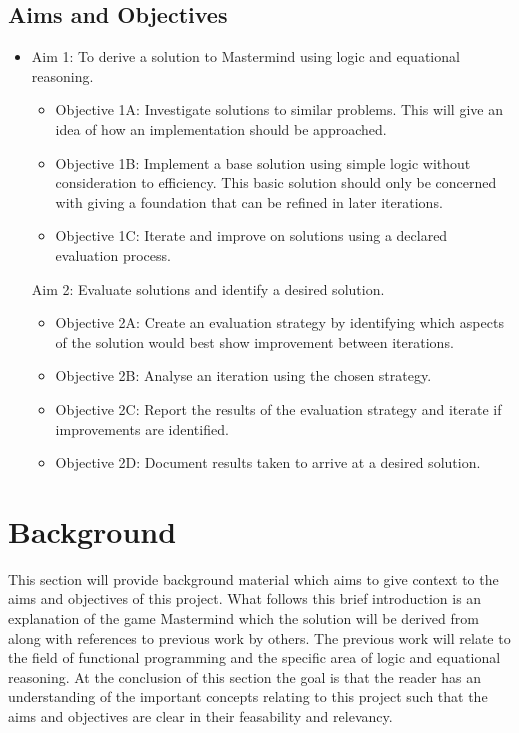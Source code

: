 \documentclass[12pt]{article}  %
\theoremstyle{definition}
\theoremstyle{remark}
\begin{document}
\subsection {Aims and Objectives}
\begin {itemize}

\item{Aim 1: To derive a solution to Mastermind using logic and equational reasoning.}
	\begin {itemize}
	\item{Objective 1A: Investigate solutions to similar problems. This will give an idea of how an implementation should be approached.}
	\item{Objective 1B:  Implement a base solution using simple logic without consideration to efficiency. This basic solution should only be concerned with giving a foundation that can be 		refined in later iterations.}
	\item{Objective 1C: Iterate and improve on solutions using a declared evaluation process.}
	\end {itemize}
Aim 2: Evaluate solutions and identify a desired solution.
	\begin {itemize}
	\item{Objective 2A: Create an evaluation strategy by identifying which aspects of the solution would best show improvement between iterations.}
	\item{Objective 2B: Analyse an iteration using the chosen strategy.}
	\item{Objective 2C: Report the results of the evaluation strategy and iterate if improvements are identified.}
	\item{Objective 2D: Document results taken to arrive at a desired solution.}
	\end {itemize}
\end {itemize}


%

\newpage                     %
\section{Background}\label{ss:back}
This section will provide background material which aims to give context to the aims and objectives of this project. What follows this brief introduction is an explanation of the game Mastermind which the solution will be derived from along with references to previous work by others. The previous work will relate to the field of functional programming and the specific area of logic and equational reasoning. At the conclusion of this section the goal is that the reader has an understanding of the important concepts relating to this project such that the aims and objectives are clear in their feasability and relevancy.
\end{document}
